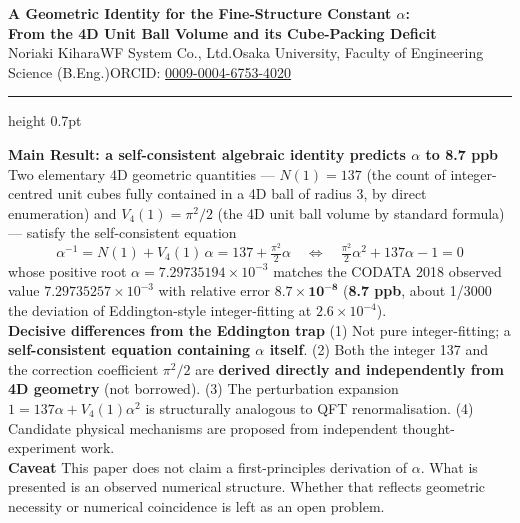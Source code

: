 \documentclass[9pt,a4paper]{article}
\begin{document}
\begin{center}
{\Large\bfseries A Geometric Identity for the Fine-Structure Constant $\alpha$:\\ From the 4D Unit Ball Volume and its Cube-Packing Deficit}\\[2pt]
{\small Noriaki Kihara\enspace WF System Co., Ltd.\enspace Osaka University, Faculty of Engineering Science (B.Eng.)\enspace ORCID: \href{https://orcid.org/0009-0004-6753-4020}{0009-0004-6753-4020}}
\end{center}

\vspace{-1pt}
\hrule height 0.7pt
\vspace{4pt}

\begin{tcolorbox}[colback=gray!7,colframe=gray!55,boxrule=0.4pt,arc=2pt,left=4pt,right=4pt,top=2pt,bottom=2pt]
{\small
\textbf{Main Result: a self-consistent algebraic identity predicts $\alpha$ to \textbf{8.7 ppb}}\enspace
Two elementary 4D geometric quantities --- $N(1) = 137$ (the count of integer-centred unit cubes fully contained in a 4D ball of radius 3, by direct enumeration) and $V_4(1) = \pi^2/2$ (the 4D unit ball volume by standard formula) --- satisfy the self-consistent equation
\[ \alpha^{-1} = N(1) + V_4(1)\,\alpha = 137 + \tfrac{\pi^2}{2}\alpha \quad\Longleftrightarrow\quad \tfrac{\pi^2}{2}\alpha^2 + 137\alpha - 1 = 0 \]
whose positive root $\alpha = 7.29735194\times 10^{-3}$ matches the CODATA 2018 observed value $7.29735257\times 10^{-3}$ with relative error $\mathbf{8.7 \times 10^{-8}}$ (\textbf{8.7 ppb}, about 1/3000 the deviation of Eddington-style integer-fitting at $2.6\times 10^{-4}$).\\[2pt]
\textbf{Decisive differences from the Eddington trap}\enspace
(1) Not pure integer-fitting; a \textbf{self-consistent equation containing $\alpha$ itself}. (2) Both the integer 137 and the correction coefficient $\pi^2/2$ are \textbf{derived directly and independently from 4D geometry} (not borrowed). (3) The perturbation expansion $1 = 137\alpha + V_4(1)\alpha^2$ is structurally analogous to QFT renormalisation. (4) Candidate physical mechanisms are proposed from independent thought-experiment work.\\[2pt]
\textbf{Caveat}\enspace
This paper does not claim a first-principles derivation of $\alpha$. What is presented is an observed numerical structure. Whether that reflects geometric necessity or numerical coincidence is left as an open problem.}
\end{tcolorbox}
\end{document}
